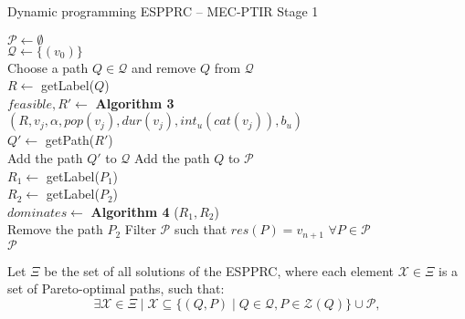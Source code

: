 \begin{algorithm}
\label{alg:rptimt-5g_stage1}

\caption{Dynamic programming ESPPRC -- MEC-PTIR Stage 1}
\DontPrintSemicolon
\small
{}
\BlankLine
\BlankLine
$\mathcal{P} \gets \emptyset$\\
$\mathcal{Q} \gets \{(v_0)\}$\\
{
    Choose a path $Q \in \mathcal{Q}$ and remove $Q$ from $\mathcal{Q}$\\
    {
        $R \gets$ getLabel($Q$)\\
        $feasible, R' \gets$ \textbf{Algorithm 3} $(R,v_j,\alpha,pop(v_{j}),dur(v_{j}),int_u(cat(v_j)),b_u)$\\
        {
            $Q' \gets$ getPath($R'$)\\
            Add the path $Q'$ to $\mathcal{Q}$
        }
    }
    Add the path $Q$ to $\mathcal{P}$\\
    {
        $R_1 \gets$ getLabel($P_1$)\\
        $R_2 \gets$ getLabel($P_2$)\\
        $dominates \gets$ \textbf{Algorithm 4} ($R_1,R_2$)\\
        {
            Remove the path $P_2$
        }
    }
}
Filter $\mathcal{P}$ such that $res(P) = v_{n+1}$ $\forall P \in \mathcal{P}$ \\
\Return $\mathcal{P}$
\end{algorithm}

Let $\Xi$ be the set of all solutions of the ESPPRC, where each element $\mathcal{X} \in \Xi$ is a set of Pareto-optimal paths, such that:
\setcounter{equation}{22}
\begin{equation}
\label{eq:extension_invariant}
	\exists \mathcal{X} \in \Xi \mid \mathcal{X} \subseteq \{ (Q,P) \mid Q \in \mathcal{Q}, P \in \mathcal{Z}(Q) \} \cup \mathcal{P},
\end{equation}

